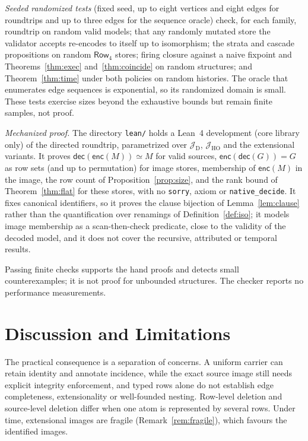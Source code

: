 \documentclass[11pt]{article}
\theoremstyle{plain}
\theoremstyle{definition}
\theoremstyle{remark}
\newcommand{\enc}{\mathsf{enc}}
\newcommand{\dec}{\mathsf{dec}}
\newcommand{\NF}[1]{\mathsf{Row}_{#1}}
\newcommand{\Img}[1]{\mathcal J_{\mathrm{#1}}}
\begin{document}
\emph{Seeded randomized tests} (fixed seed, up to eight vertices and eight edges for
roundtrips and up to three edges for the sequence oracle) check, for each family,
roundtrip on random valid models; that any randomly mutated store the validator accepts
re-encodes to itself up to isomorphism; the strata and cascade propositions on random
$\NF4$ stores; firing closure against a naive fixpoint and Theorems~\ref{thm:exec}
and~\ref{thm:coincide} on random structures; and Theorem~\ref{thm:time} under both
policies on random histories. The oracle that enumerates edge sequences is exponential, so
its randomized domain is small. These tests exercise sizes beyond the exhaustive bounds
but remain finite samples, not proof.

\emph{Mechanized proof.} The directory \texttt{lean/} holds a Lean~4 development (core
library only) of the directed roundtrip, parametrized over $\Img{D}$, $\Img{HO}$ and the
extensional variants. It proves $\dec(\enc(M))\simeq M$ for valid sources,
$\enc(\dec(G))=G$ as row sets (and up to permutation) for image stores, membership of
$\enc(M)$ in the image, the row count of Proposition~\ref{prop:size}, and the rank bound of
Theorem~\ref{thm:flat} for these stores, with no \texttt{sorry}, axiom or
\texttt{native\_decide}. It fixes canonical identifiers, so it proves the clause
bijection of Lemma~\ref{lem:clause} rather than the quantification over renamings of
Definition~\ref{def:iso}; it models image membership as a scan-then-check predicate,
close to the validity of the decoded model, and it does not cover the recursive,
attributed or temporal results.

\begin{table}[t]
\centering\small

\caption{Counts produced by the retained checkers. A case is a model, store or query
configuration, not an independent theorem. Bounds and the exhaustive/sampled distinction
are recorded in \texttt{validation-results.json}.}
\label{tab:validation}
\end{table}
Passing finite checks supports the hand proofs and detects small counterexamples; it is not
proof for unbounded structures. The checker reports no performance measurements.

\section{Discussion and Limitations}\label{sec:discussion}
The practical consequence is a separation of concerns. A uniform carrier can retain
identity and annotate incidence, while the exact source image still needs explicit integrity
enforcement, and typed rows alone do not establish edge completeness, extensionality or
well-founded nesting. Row-level deletion and source-level deletion differ when one atom is
represented by several rows. Under time, extensional images are fragile
(Remark~\ref{rem:fragile}), which favours the identified images.
\end{document}
